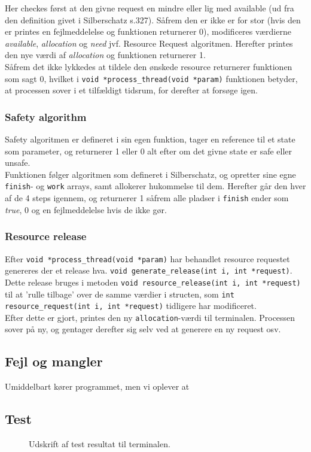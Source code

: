 \documentclass[main.tex]{subfile}
\begin{document}
Her checkes først at den givne request en mindre eller lig med available (ud fra den definition givet i Silberschatz s.327). Såfrem den er ikke er for stor (hvis den er printes en fejlmeddelelse og funktionen returnerer 0), modificeres værdierne \textit{available}, \textit{allocation} og \textit{need} jvf. Resource Request algoritmen. Herefter printes den nye værdi af \textit{allocation} og funktionen returnerer 1.\\

Såfrem det ikke lykkedes at tildele den ønskede resource returnerer funktionen som sagt 0, hvilket i \texttt{void *process\_thread(void *param)} funktionen betyder, at processen sover i et tilfældigt tidsrum, for derefter at forsøge igen.

\subsubsection{Safety algorithm}
Safety algoritmen er defineret i sin egen funktion, tager en reference til et state som parameter, og returnerer 1 eller 0 alt efter om det givne state er safe eller unsafe.\\

Funktionen følger algoritmen som defineret i Silberschatz, og opretter sine egne \texttt{finish}- og \texttt{work} arrays, samt allokerer hukommelse til dem. Herefter går den hver af de 4 steps igennem, og returnerer 1 såfrem alle pladser i \texttt{finish} ender som \textit{true}, 0 og en fejlmeddelelse hvis de ikke gør.

\subsubsection{Resource release}
Efter \texttt{void *process\_thread(void *param)} har behandlet resource requestet genereres der et release hva. \texttt{void generate\_release(int i, int *request)}. Dette release bruges i metoden \texttt{void resource\_release(int i, int *request)} til at 'rulle tilbage' over de samme værdier i structen, som \texttt{int resource\_request(int i, int *request)} tidligere har modificeret.\\

Efter dette er gjort, printes den ny \texttt{allocation}-værdi til terminalen. Processen sover på ny, og gentager derefter sig selv ved at generere en ny request osv.

\subsection{Fejl og mangler}
Umiddelbart kører programmet, men vi oplever at 

\subsection{Test}

\begin{figure}[H]
\center
{}
\caption{Udskrift af test resultat til terminalen.}

\end{figure}
\end{document}
